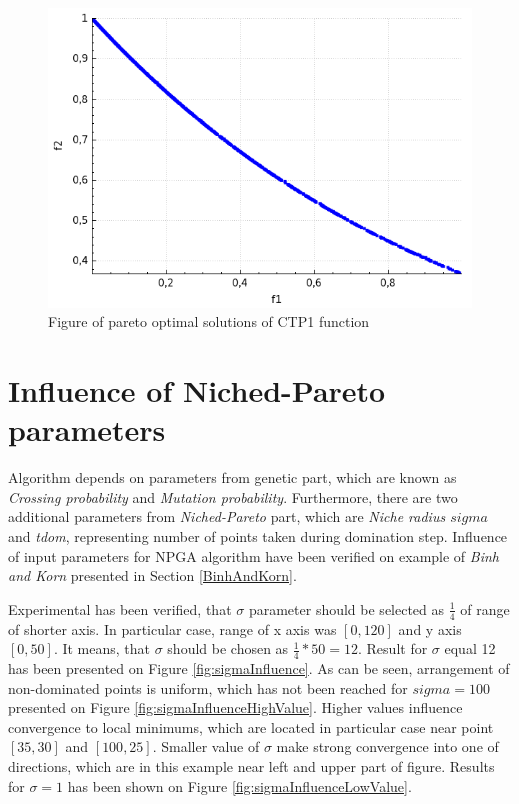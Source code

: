 \documentclass[a4paper, 11pt]{article}
\begin{document}
	\begin{figure}[H]
	\centering
	\includegraphics[scale=0.4]{ctp1}
	\caption{Figure of pareto optimal solutions of CTP1 function}
	\label{fig:ctp1}
	\end{figure}

	\newpage
	\section{Influence of Niched-Pareto parameters}
	Algorithm depends on parameters from genetic part, which are known as \textit{Crossing probability} and \textit{Mutation probability}. Furthermore, there are two additional parameters from \textit{Niched-Pareto} part, which are \textit{Niche radius $sigma$} and \textit{tdom}, representing number of points taken during domination step.
	Influence of input parameters for NPGA algorithm have been verified on example of \textit{Binh and Korn} presented in Section \ref{BinhAndKorn}.
	
	Experimental has been verified, that $\sigma$ parameter should be selected as $\frac{1}{4}$ of range of shorter axis. In particular case, range of x axis was $[0,120]$ and y axis $[0,50]$. It means, that $\sigma$ should be chosen as $\frac{1}{4}*50=12$. Result for $\sigma$ equal 12 has been presented on Figure \ref{fig:sigmaInfluence}. As can be seen, arrangement of non-dominated points is uniform, which has not been reached for $sigma=100$ presented on Figure \ref{fig:sigmaInfluenceHighValue}. Higher values influence convergence to local minimums, which are located in particular case near point $[35,30]$ and $[100,25]$. Smaller value of $\sigma$ make strong convergence into one of directions, which are in this example near left and upper part of figure. Results for $\sigma=1$ has been shown on Figure \ref{fig:sigmaInfluenceLowValue}.
	
\end{document}
